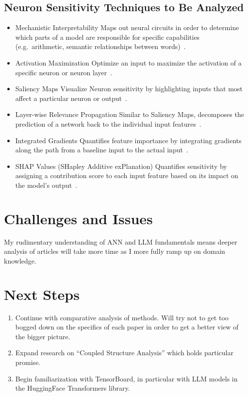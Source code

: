 \documentclass{article}
\begin{document}
    \subsection*{Neuron Sensitivity Techniques to Be Analyzed}
    \begin{itemize}
        \item Mechanistic Interpretability
        \subitem Maps out neural circuits in order to determine which parts of a model are responsible for specific capabilities (e.g.\ arithmetic, semantic relationships between words)~\cite{singh2024rethinking}.
        \item Activation Maximization
        \subitem Optimize an input to maximize the activation of a specific neuron or neuron layer~\cite{erhan2009visualizing}.
        \item Saliency Maps
        \subitem Visualize Neuron sensitivity by highlighting inputs that most affect a particular neuron or output~\cite{hsu2023explainable}.
        \item Layer-wise Relevance Propagation
        \subitem Similar to Saliency Maps, decomposes the prediction of a network back to the individual input features~\cite{jia2022interpreting}.
        \item Integrated Gradients
        \subitem Quantifies feature importance by integrating gradients along the path from a baseline input to the actual input~\cite{sundararajan2017axiomatic}.
        \item SHAP Values (SHapley Additive exPlanation)
        \subitem Quantifies sensitivity by assigning a contribution score to each input feature based on its impact on the model’s output~\cite{nohara2022explanation}.
    \end{itemize}

    \section*{Challenges and Issues}
    My rudimentary understanding of ANN and LLM fundamentals means deeper analysis of articles will take more time as I more fully ramp up on domain knowledge.

    \section*{Next Steps}
    \begin{enumerate}
        \item Continue with comparative analysis of methods.
        Will try not to get too bogged down on the specifics of each paper in order to get a better view of the bigger picture.
        \item Expand research on ``Coupled Structure Analysis'' which holds particular promise.
        \item Begin familiarization with TensorBoard, in particular with LLM models in the HuggingFace Transformers library.
    \end{enumerate}
\end{document}
